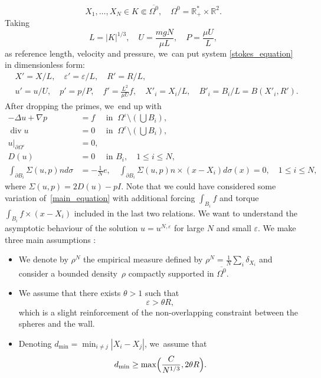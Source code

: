 \documentclass[JEP,XML,SOM,Unicode,NoEqCountersInSection,published]{cedram}
\let\epsilon\varepsilon
\renewcommand{\div}{\operatorname{div}}
\theoremstyle{plain}
\theoremstyle{definition}
\let\pa\partial
\let\na\nabla
\let\eps\varepsilon
\newcommand{\R}{\mathbb{R}}
\begin{document}
\begin{equation} \label{eq_assumption}
X_1, \dots, X_N \in K \Subset \overline{\Omega^0}, \quad \Omega^0 = \R^*_+ \times \R^2.
\end{equation}
Taking
\[
L = |K|^{1/3}, \quad U = \frac{mgN}{\mu L}, \quad P = \frac{\mu U}{L},
\]
as reference length, velocity and pressure, we~can put system \eqref{stokes_equation} in dimensionless form:
\begin{align*}
& X' = X/L, \quad \eps' = \eps/L, \quad R'= R/L, \\
& u' = u/U, \quad p' = p/P, \quad f' = \frac{L^2}{\mu U} f, \quad X'_i = X_i/L, \quad B'_i = B_i/L = B(X'_i, R').
\end{align*}
After dropping the primes, we~end up with
\begin{equation} \label{main_equation}
\begin{aligned}
-\Delta u + \na p & = f \quad \text{ in } \: \Omega^\eps \setminus(\bigcup B_i), \\
\div u & = 0 \quad \text{ in } \: \Omega ^\eps\setminus(\bigcup B_i), \\
u\vert_{\pa \Omega^\eps} & = 0, \\
D(u) & = 0 \quad \text{ in } B_i, \quad 1 \le i \le N, \\
\int_{\pa B_i} \Sigma(u,p) n d \sigma & = -\frac{1}{N}e, \quad \int_{\pa B_i} \Sigma(u,p) n \times (x-X_i) d \sigma(x)= 0, \quad 1 \le i \le N,
\end{aligned}
\end{equation}
where $\Sigma(u,p) = 2D(u) - p I$. Note that we could have considered some variation of~\eqref{main_equation} with additional forcing $\int_{B_i} f$ and torque $\int_{B_i} f \times (x-X_i)$ included in the last two relations.
We want to understand the asymptotic behaviour of the solution $u = u^{N,\eps}$ for large $N$ and small $\eps$. We make three main assumptions :
\begin{itemize}
\item We denote by $\rho^N$ the empirical measure defined by
$
\rho^N = \frac{1}{N} \sum_i \delta_{X_i}
$
and consider a bounded density~$\rho$ compactly supported in $\overline{\Omega^0}$.
\item We assume that there exists $\theta>1$ such that
\begin{equation} \label{H1}
\epsilon> \theta R,
\end{equation}
which is a slight reinforcement of the non-overlapping constraint between the spheres and the wall.
\item Denoting $d_{\min} = \min_{i \neq j} |X_i - X_j|$, we~assume that
\begin{equation}\label{hyp_dmin}
d_{\min}\geq \max\Bigl (\frac{C}{N^{1/3}},2\theta R \Bigr).
\end{equation}
\end{itemize}
\end{document}
